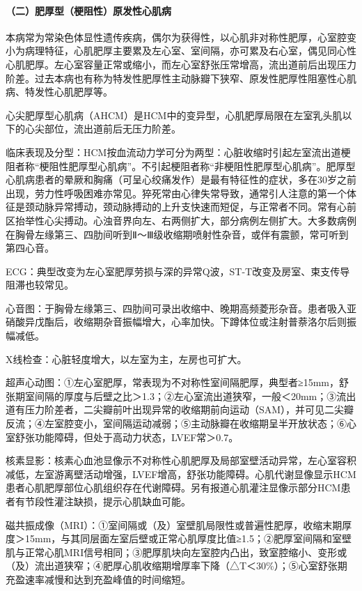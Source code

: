\paragraph{（二）肥厚型（梗阻性）原发性心肌病}

本病常为常染色体显性遗传疾病，偶尔为获得性，以心肌非对称性肥厚，心室腔变小为病理特征，心肌肥厚主要累及左心室、室间隔，亦可累及右心室，偶见同心性心肌肥厚。左心室容量正常或缩小，而左心室舒张压常增高，流出道前后出现压力阶差。过去本病也有称为特发性肥厚性主动脉瓣下狭窄、原发性肥厚性阻塞性心肌病、特发性心肌肥厚等。

心尖肥厚型心肌病（AHCM）是HCM中的变异型，心肌肥厚局限在左室乳头肌以下的心尖部位，流出道前后无压力阶差。

临床表现及分型：HCM按血流动力学可分为两型：心脏收缩时引起左室流出道梗阻者称“梗阻性肥厚型心肌病”。不引起梗阻者称“非梗阻性肥厚型心肌病”。肥厚型心肌病患者的晕厥和胸痛（可呈心绞痛发作）是最有特征性的症状，多在30岁之前出现，劳力性呼吸困难亦常见。猝死常由心律失常导致，通常引人注意的第一个体征是颈动脉异常搏动，颈动脉搏动的上升支快速而短促，与正常者不同。常有心前区抬举性心尖搏动。心浊音界向左、右两侧扩大，部分病例左侧扩大。大多数病例在胸骨左缘第三、四肋间听到Ⅱ～Ⅲ级收缩期喷射性杂音，或伴有震颤，常可听到第四心音。

ECG：典型改变为左心室肥厚劳损与深的异常Q波，ST-T改变及房室、束支传导阻滞也较常见。

心音图：于胸骨左缘第三、四肋间可录出收缩中、晚期高频菱形杂音。患者吸入亚硝酸异戊酯后，收缩期杂音振幅增大，心率加快。下蹲体位或注射普萘洛尔后则振幅减低。

X线检查：心脏轻度增大，以左室为主，左房也可扩大。

超声心动图：①左心室肥厚，常表现为不对称性室间隔肥厚，典型者≥15mm，舒张期室间隔的厚度与后壁之比＞1.3；②左心室流出道狭窄，一般＜20mm；③流出道有压力阶差者，二尖瓣前叶出现异常的收缩期前向运动（SAM），并可见二尖瓣反流；④左室腔变小，室间隔运动减弱；⑤主动脉瓣在收缩期呈半开放状态；⑥心室舒张功能障碍，但处于高动力状态，LVEF常＞0.7。

核素显影：核素心血池显像示不对称性心肌肥厚及局部室壁活动异常，左心室容积减低，左室游离壁活动增强，LVEF增高，舒张功能障碍。心肌代谢显像显示HCM患者心肌肥厚部位心肌组织存在代谢障碍。另有报道心肌灌注显像示部分HCM患者有节段性灌注缺损，提示心肌缺血可能。

磁共振成像（MRI）：①室间隔或（及）室壁肌局限性或普遍性肥厚，收缩末期厚度＞15mm，与其同层面左室后壁或正常心肌厚度比值≥1.5；②肥厚室间隔和室壁肌与正常心肌MRI信号相同；③肥厚肌块向左室腔内凸出，致室腔缩小、变形或（及）流出道狭窄；④肥厚心肌收缩期增厚率下降（△T＜30\%）；⑤心室舒张期充盈速率减慢和达到充盈峰值的时间缩短。

